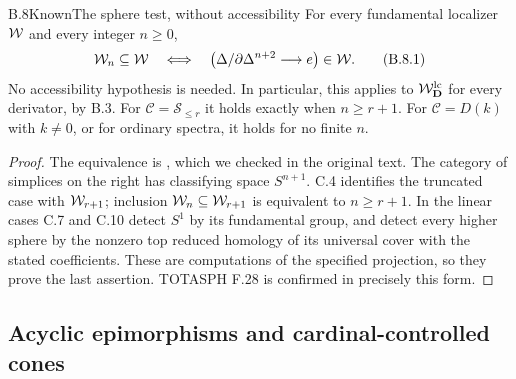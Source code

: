 \begin{claim}{B.8}{Known}{The sphere test, without accessibility}
For every fundamental localizer $\mathcal W$ and every integer $n\geq0$,
\[
 \mathcal W_n\subseteq\mathcal W
 \quad\Longleftrightarrow\quad
 \bigl(\Delta/\partial\Delta^{n+2}\longrightarrow e\bigr)\in\mathcal W.
 \tag{B.8.1}
\]
No accessibility hypothesis is needed. In particular, this applies
to $\mathcal W_{\mathbf D}^{\mathrm{lc}}$ for every derivator, by B.3.
For $\mathcal C=\mathcal S_{\leq r}$ it holds exactly when
$n\geq r+1$. For $\mathcal C=D(k)$ with $k\ne0$, or for
ordinary spectra, it holds for no finite $n$.
\end{claim}
\begin{proof}
The equivalence is
\citet[Proposition~9.2.17]{Cisinski2006}, which we checked in
the original text. The category of simplices on the right has
classifying space $S^{n+1}$. C.4 identifies the truncated case
with $\mathcal W_{r+1}$; inclusion $\mathcal W_n\subseteq\mathcal W_{r+1}$ is
equivalent to $n\geq r+1$. In the linear cases C.7 and C.10
detect $S^1$ by its fundamental group, and detect every higher
sphere by the nonzero top reduced homology of its universal
cover with the stated coefficients. These are computations of
the specified projection, so they prove the last assertion.
TOTASPH F.28 is confirmed in precisely this form.
\end{proof}

\subsection{Acyclic epimorphisms and cardinal-controlled cones}

